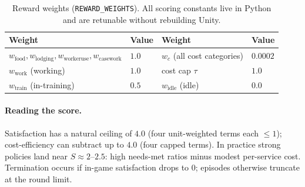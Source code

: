 \documentclass[11pt]{article}
\newcommand{\py}[1]{{\color{pyorange}\texttt{\small #1}}}
\begin{document}
\begin{table}[h]
\centering
\footnotesize
\renewcommand{\arraystretch}{1.15}
\begin{tabular}{llll}
\toprule
\textbf{Weight} & \textbf{Value} & \textbf{Weight} & \textbf{Value} \\
\midrule
$w_{\text{food}},w_{\text{lodging}},w_{\text{workeruse}},w_{\text{casework}}$ & $1.0$ & $w_c$ (all cost categories) & $0.0002$ \\
$w_{\text{work}}$ (working) & $1.0$ & cost cap $\tau$ & $1.0$ \\
$w_{\text{train}}$ (in-training) & $0.5$ & $w_{\text{idle}}$ (idle) & $0.0$ \\
\bottomrule
\end{tabular}
\caption{Reward weights (\py{REWARD\_WEIGHTS}). All scoring constants live in Python and are
retunable without rebuilding Unity.}
\label{tab:weights}
\end{table}

\paragraph{Reading the score.} Satisfaction has a natural ceiling of $4.0$ (four unit-weighted
terms each $\le 1$); cost-efficiency can subtract up to $4.0$ (four capped terms). In practice
strong policies land near $S \approx 2$--$2.5$: high needs-met ratios minus modest per-service cost.
Termination occurs if in-game satisfaction drops to $0$; episodes otherwise truncate at the
round limit.
\end{document}
